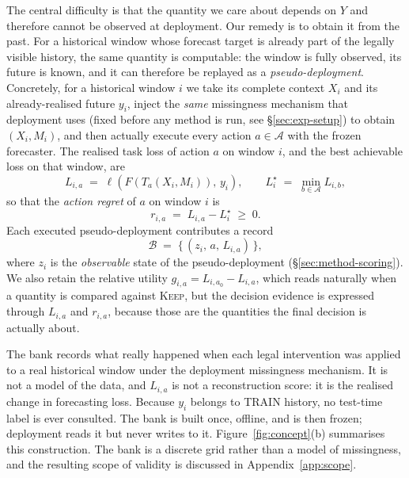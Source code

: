 \documentclass{article}
\newcommand{\calA}{\mathcal{A}}
\newcommand{\calB}{\mathcal{B}}
\newcommand{\loss}{\ell}
\begin{document}
The central difficulty is that the quantity we care about depends on $Y$ and therefore
cannot be observed at deployment. Our remedy is to obtain it from the past. For a
historical window whose forecast target is already part of the legally visible history, the
same quantity is computable: the window is fully observed, its future is known, and it can
therefore be replayed as a \emph{pseudo-deployment}. Concretely, for a historical window $i$
we take its complete context $X_i$ and its already-realised future $y_i$, inject the
\emph{same} missingness mechanism that deployment uses (fixed before any method is run, see
\S\ref{sec:exp-setup}) to obtain $(X_i, M_i)$, and then actually execute every action
$a \in \calA$ with the frozen forecaster. The realised task loss of action $a$ on window $i$,
and the best achievable loss on that window, are
\begin{equation}
  L_{i,a} \;=\; \loss\!\left(F(T_a(X_i, M_i)),\, y_i\right),
  \qquad
  L_i^{\star} \;=\; \min_{b \in \calA} L_{i,b} ,
  \label{eq:loss}
\end{equation}
so that the \emph{action regret} of $a$ on window $i$ is
\begin{equation}
  r_{i,a} \;=\; L_{i,a} - L_i^{\star} \;\ge\; 0 .
  \label{eq:regret}
\end{equation}
Each executed pseudo-deployment contributes a record
\begin{equation}
  \calB \;=\; \bigl\{\, (z_i,\, a,\, L_{i,a}) \,\bigr\},
  \label{eq:replay-bank}
\end{equation}
where $z_i$ is the \emph{observable} state of the pseudo-deployment
(\S\ref{sec:method-scoring}). We also retain the relative utility
$g_{i,a} = L_{i,a_0} - L_{i,a}$, which reads naturally when a quantity is compared against
\textsc{Keep}, but the decision evidence is expressed through $L_{i,a}$ and $r_{i,a}$,
because those are the quantities the final decision is actually about.

The bank records what really happened when each legal intervention was applied to a real
historical window under the deployment missingness mechanism. It is not a model of the data,
and $L_{i,a}$ is not a reconstruction score: it is the realised change in forecasting loss.
Because $y_i$ belongs to TRAIN history, no test-time label is ever consulted. The bank is
built once, offline, and is then frozen; deployment reads it but never writes to it.
Figure~\ref{fig:concept}(b) summarises this construction. The bank is a discrete grid rather
than a model of missingness, and the resulting scope of validity is discussed in
Appendix~\ref{app:scope}.
\end{document}
